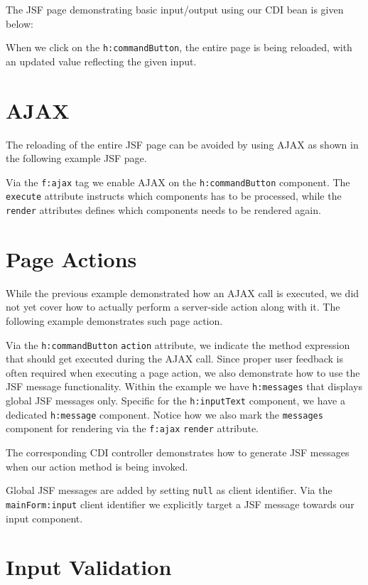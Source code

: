 The JSF page demonstrating basic input/output using our CDI bean is given below:

When we click on the \texttt{h:commandButton}, the entire page is being reloaded, with an updated value reflecting the given input.


\section{AJAX}

The reloading of the entire JSF page can be avoided by using AJAX as shown in the following example JSF page.

Via the \texttt{f:ajax} tag we enable AJAX on the \texttt{h:commandButton} component.
The \texttt{execute} attribute instructs which components has to be processed, while the \texttt{render} attributes defines which components needs to be rendered again.


\section{Page Actions}
While the previous example demonstrated how an AJAX call is executed, we did not yet cover how to actually perform a server-side action along with it.
The following example demonstrates such page action.

Via the \texttt{h:commandButton} \texttt{action} attribute, we indicate the method expression that should get executed during the AJAX call.
Since proper user feedback is often required when executing a page action, we also demonstrate how to use the JSF message functionality.
Within the example we have \texttt{h:messages} that displays global JSF messages only.
Specific for the \texttt{h:inputText} component, we have a dedicated \texttt{h:message} component.
Notice how we also mark the \texttt{messages} component for rendering via the \texttt{f:ajax} \texttt{render} attribute.

The corresponding CDI controller demonstrates how to generate JSF messages when our action method is being invoked.

Global JSF messages are added by setting \texttt{null} as client identifier.
Via the \texttt{mainForm:input} client identifier we explicitly target a JSF message towards our input component.

\section{Input Validation}

